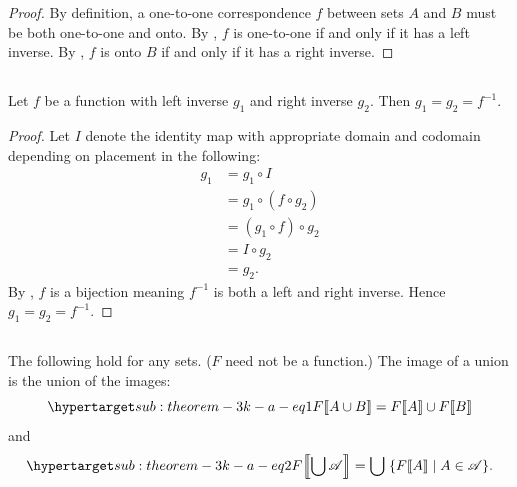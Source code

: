 \documentclass{report}
\begin{document}
  \begin{proof}
    By definition, a one-to-one correspondence $f$ between sets $A$ and $B$ must
      be both one-to-one and onto.
    By , $f$ is one-to-one if and only if it has a
      left inverse.
    By , $f$ is onto $B$ if and only if it has a right
      inverse.
  \end{proof}

\subsection{}%

  \begin{lemma}
    Let $f$ be a function with left inverse $g_1$ and right inverse $g_2$.
    Then $g_1 = g_2 = f^{-1}$.
  \end{lemma}

  \begin{proof}
    Let $I$ denote the identity map with appropriate domain and codomain
      depending on placement in the following:
      \begin{align*}
        g_1
          & = g_1 \circ I \\
          & = g_1 \circ (f \circ g_2) \\
          & = (g_1 \circ f) \circ g_2 \\
          & = I \circ g_2 \\
          & = g_2.
      \end{align*}
    By , $f$ is a bijection meaning $f^{-1}$
      is both a left and right inverse.
    Hence $g_1 = g_2 = f^{-1}$.
  \end{proof}

\subsection{}%

  \begin{theorem}[3K(a)]
    The following hold for any sets. ($F$ need not be a function.)
    The image of a union is the union of the images:
      \begin{equation}
        \hyperlabel{sub:theorem-3k-a-eq1}
        \img{F}{A \cup B} = \img{F}{A} \cup \img{F}{B}
      \end{equation}
      and
      \begin{equation}
        \hyperlabel{sub:theorem-3k-a-eq2}
        \img{F}{\bigcup{\mathscr{A}}} =
          \bigcup\;\{\img{F}{A} \mid A \in \mathscr{A}\}.
      \end{equation}
  \end{theorem}
\end{document}
